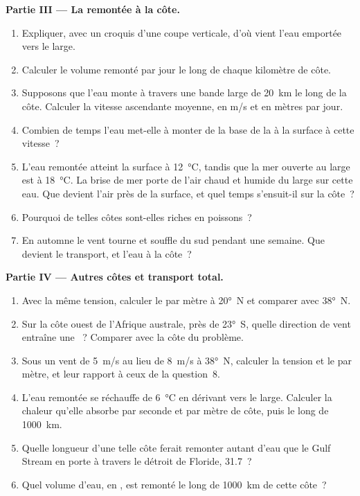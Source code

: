 \begin{problem}
\medskip
\noindent\textbf{Partie III --- La remontée à la côte.}
\begin{enumerate}[resume]
  \item Expliquer, avec un croquis d'une coupe verticale, d'où vient l'eau emportée
        vers le large.
  \item Calculer le volume remonté par jour le long de chaque kilomètre de côte.
  \item Supposons que l'eau monte à travers une bande large de \qty{20}{km} le long de la côte.
        Calculer la vitesse ascendante moyenne, en \unit{m/s} et en mètres par jour.
  \item Combien de temps l'eau met-elle à monter de la base de la  à la
        surface à cette vitesse~?
  \item L'eau remontée atteint la surface à \qty{12}{\celsius}, tandis que la
        mer ouverte au large est à \qty{18}{\celsius}. La brise de mer porte de l'air chaud et
        humide du large sur cette eau. Que devient l'air près de la
        surface, et quel temps s'ensuit-il sur la côte~?
  \item Pourquoi de telles côtes sont-elles riches en poissons~?
  \item En automne le vent tourne et souffle du sud pendant une semaine. Que devient
        le transport, et l'eau à la côte~?
\end{enumerate}

\medskip
\noindent\textbf{Partie IV --- Autres côtes et transport total.}
\begin{enumerate}[resume]
  \item Avec la même tension, calculer le  par mètre à \ang{20}~N
        et comparer avec \ang{38}~N.
  \item Sur la côte ouest de l'Afrique australe, près de \ang{23}~S, quelle direction de vent
        entraîne une ~? Comparer avec la côte du problème.
  \item Sous un vent de \qty{5}{m/s} au lieu de \qty{8}{m/s} à \ang{38}~N, calculer
        la tension et le  par mètre, et leur rapport à ceux de la
        question~8.
  \item L'eau remontée se réchauffe de \qty{6}{\celsius} en dérivant vers le large. Calculer
        la chaleur qu'elle absorbe par seconde et par mètre de côte, puis le long de
        \qty{1000}{km}.
  \item Quelle longueur d'une telle côte ferait remonter autant d'eau que le Gulf Stream
        en porte à travers le détroit de Floride, \qty{31.7}{\sverdrup}~?
  \item Quel volume d'eau, en , est remonté le long de \qty{1000}{km} de cette
        côte~?
\end{enumerate}
\end{problem}
